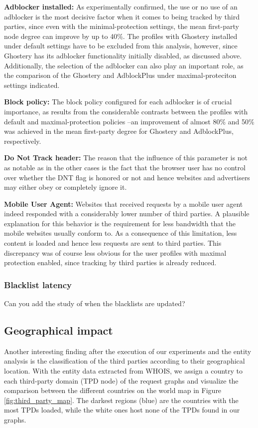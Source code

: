 \documentclass{sig-alternate}
\begin{document}
\textbf{Adblocker installed:} As experimentally confirmed, the use or no use of an adblocker is the most decisive factor when it comes to being tracked by third parties, since even with the minimal-protection settings, the mean first-party node degree can improve by up to 40\%. The profiles with Ghostery installed under default settings have to be excluded from this analysis, however, since Ghostery has its adblocker functionality initially disabled, as discussed above. Additionally, the selection of the adblocker can also play an important role, as the comparison of the Ghostery and AdblockPlus under maximal-proteciton settings indicated.

\textbf{Block policy:} The block policy configured for each adblocker is of crucial importance, as results from the considerable contrasts between the profiles with default and maximal-protection policies --an improvement of almost 80\% and 50\% was achieved in the mean first-party degree for Ghostery and AdblockPlus, respectively.

\textbf{Do Not Track header:} The reason that the influence of this parameter is not as notable as in the other cases is the fact that the browser user has no control over whether the DNT flag is honored or not and hence websites and advertisers may either obey or completely ignore it.

\textbf{Mobile User Agent:} Websites that received requests by a mobile user agent indeed responded with a considerably lower number of third parties. A plausible explanation for this behavior is the requirement for less bandwidth that the mobile websites usually conform to. As a consequence of this limitation, less content is loaded and hence less requests are sent to third parties. This discrepancy was of course less obvious for the user profiles with maximal protection enabled, since tracking by third parties is already reduced.

\subsubsection{Blacklist latency}
{\color{red}Can you add the study of when the blacklists are updated?}

\subsection{Geographical impact}

Another interesting finding after the execution of our experiments and the entity analysis is the classification of the third parties according to their geographical location. With the entity data extracted from WHOIS, we assign a country to each third-party domain (TPD node) of the request graphs and visualize the comparison between the different countries on the world map in Figure \ref{fig:third_party_map}. The darkest regions (blue) are the countries with the most TPDs loaded, while the white ones host none of the TPDs found in our graphs.
\end{document}
